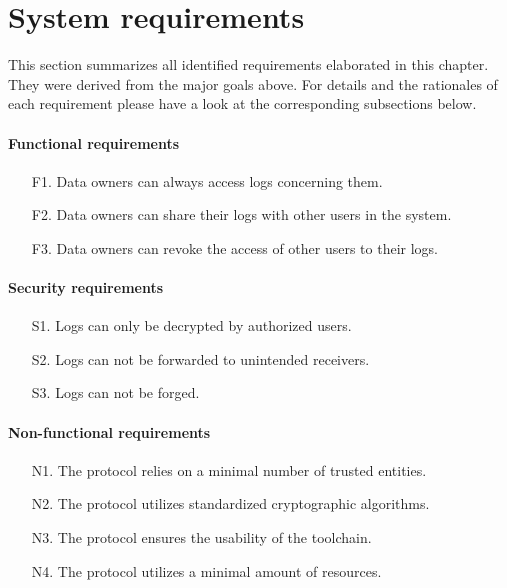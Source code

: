 \documentclass[../main.tex]{subfiles}
\begin{document}
\section{System requirements}\label{system-requriements}
This section summarizes all identified requirements elaborated in this chapter.
They were derived from the major goals above.
For details and the rationales of each requirement please have a look at the corresponding subsections below.

\paragraph*{Functional requirements}
\begin{itemize}
    \item [F1.] Data owners can always access logs concerning them.
    \item [F2.] Data owners can share their logs with other users in the system.
    \item [F3.] Data owners can revoke the access of other users to their logs.
\end{itemize}

\paragraph{Security requirements}
\begin{itemize}
    \item [S1.] Logs can only be decrypted by authorized users.
    \item [S2.] Logs can not be forwarded to unintended receivers.
    \item [S3.] Logs can not be forged.
\end{itemize}

\paragraph{Non-functional requirements}
\begin{itemize}
    \item [N1.] The protocol relies on a minimal number of trusted entities.
    \item [N2.] The protocol utilizes standardized cryptographic algorithms.
    \item [N3.] The protocol ensures the usability of the toolchain.
    \item [N4.] The protocol utilizes a minimal amount of resources.
\end{itemize}
\end{document}
